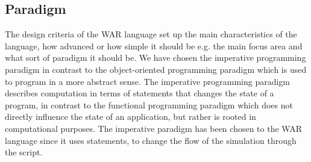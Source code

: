 \subsection{Paradigm}
The design criteria of the WAR language set up the main characteristics of the language, how advanced or how simple it should be e.g. the main focus area and what sort of paradigm it should be. We have chosen the imperative programming paradigm in contrast to the object-oriented programming paradigm which is used to program in a more abstract sense. The imperative programming paradigm describes computation in terms of statements that changes the state of a program, in contrast to the functional programming paradigm which does not directly influence the state of an application, but rather is rooted in computational purposes. The imperative paradigm has been chosen to the WAR language since it uses statements, to change the flow of the simulation through the script.


